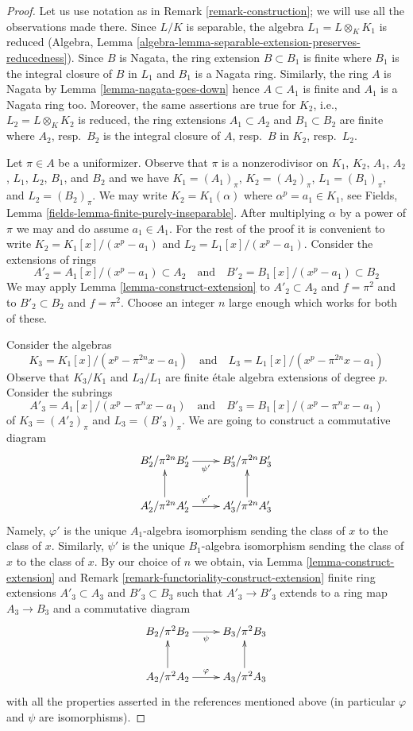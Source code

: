 \documentclass[10pt,a4paper]{amsart}
\theoremstyle{plain}
\theoremstyle{definition}
\theoremstyle{remark}
\numberwithin{equation}{subsection}
\begin{document}
\begin{proof}
Let us use notation as in Remark \ref{remark-construction}; we will use all
the observations made there. Since $L/K$ is separable, the algebra
$L_1 = L \otimes_K K_1$ is reduced
(Algebra, Lemma \ref{algebra-lemma-separable-extension-preserves-reducedness}).
Since $B$ is Nagata, the ring extension $B \subset B_1$ is finite
where $B_1$ is the integral closure of $B$ in $L_1$
and $B_1$ is a Nagata ring. Similarly, the ring $A$ is Nagata by
Lemma \ref{lemma-nagata-goes-down} hence $A \subset A_1$ is finite
and $A_1$ is a Nagata ring too. Moreover, the same assertions are true
for $K_2$, i.e., $L_2 = L \otimes_K K_2$ is reduced,
the ring extensions $A_1 \subset A_2$ and $B_1 \subset B_2$
are finite where $A_2$, resp.\ $B_2$ is the integral closure of
$A$, resp.\ $B$ in $K_2$, resp.\ $L_2$.

\medskip\noindent
Let $\pi \in A$ be a uniformizer. Observe that $\pi$ is a nonzerodivisor
on $K_1$, $K_2$, $A_1$, $A_2$, $L_1$, $L_2$, $B_1$, and $B_2$ and we have
$K_1 = (A_1)_\pi$, $K_2 = (A_2)_\pi$, $L_1 = (B_1)_\pi$, and $L_2 = (B_2)_\pi$.
We may write $K_2 = K_1(\alpha)$ where $\alpha^p = a_1 \in K_1$, see
Fields, Lemma \ref{fields-lemma-finite-purely-inseparable}.
After multiplying $\alpha$ by a power of $\pi$ we may and do assume
$a_1 \in A_1$. For the rest of the proof it is convenient to write
$K_2 = K_1[x]/(x^p - a_1)$ and $L_2 = L_1[x]/(x^p - a_1)$.
Consider the extensions of rings
$$
A'_2 = A_1[x]/(x^p - a_1) \subset A_2
\quad\text{and}\quad
B'_2 = B_1[x]/(x^p - a_1) \subset B_2
$$
We may apply Lemma \ref{lemma-construct-extension} to
$A'_2 \subset A_2$ and $f = \pi^2$ and to $B'_2 \subset B_2$ and $f = \pi^2$.
Choose an integer $n$ large enough which works for both of these.

\medskip\noindent
Consider the algebras
$$
K_3 = K_1[x]/(x^p - \pi^{2n} x - a_1)
\quad\text{and}\quad
L_3 = L_1[x]/(x^p - \pi^{2n} x - a_1)
$$
Observe that $K_3/K_1$ and $L_3/L_1$ are finite \'etale algebra extensions of
degree $p$. Consider the subrings
$$
A'_3 = A_1[x]/(x^p - \pi^n x - a_1)
\quad\text{and}\quad
B'_3 = B_1[x]/(x^p - \pi^n x - a_1)
$$
of $K_3 = (A'_2)_\pi$ and $L_3 = (B'_3)_\pi$. We are going to construct
a commutative diagram
$$
\xymatrix{
B'_2/\pi^{2n} B'_2 \ar[r]_{\psi'} & B'_3/\pi^{2n} B'_3 \\
A'_2/\pi^{2n} A'_2 \ar[r]^{\varphi'} \ar[u] & A'_3/\pi^{2n} A'_3 \ar[u]
}
$$
Namely, $\varphi'$ is the unique $A_1$-algebra isomorphism
sending the class of $x$ to the class of $x$.
Similarly, $\psi'$ is the unique $B_1$-algebra isomorphism sending
the class of $x$ to the class of $x$. By our choice of $n$ we obtain, via
Lemma \ref{lemma-construct-extension} and
Remark \ref{remark-functoriality-construct-extension}
finite ring extensions $A'_3 \subset A_3$ and $B'_3 \subset B_3$
such that $A'_3 \to B'_3$ extends to a ring map $A_3 \to B_3$
and a commutative diagram
$$
\xymatrix{
B_2/\pi^2 B_2 \ar[r]_\psi & B_3/\pi^2B_3 \\
A_2/\pi^2 A_2 \ar[r]^\varphi \ar[u] & A_3/\pi^2A_3 \ar[u]
}
$$
with all the properties asserted in the references mentioned above
(in particular $\varphi$ and $\psi$ are isomorphisms).


\end{proof}
\end{document}

